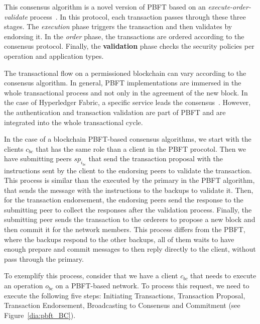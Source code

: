 \documentclass[conference]{IEEEtran}
\begin{document}
This consensus algorithm is a novel version of PBFT based on an \textit{execute-order-validate} process~\cite{androulaki2018hyperledger}. In this protocol, each transaction passes through these three stages. The \textit{execution} phase triggers the transaction and then validates by endorsing it. In the \textit{order} phase, the transactions are ordered according to the consensus protocol. Finally, the \textbf{validation} phase checks the security policies per operation and application types.

The transactional flow on a permissioned blockchain can vary according to the consensus algorithm. In general, PBFT implementations are immersed in the whole transactional process and not only in the agreement of the new block. In the case of Hyperledger Fabric, a specific service leads the consensus~\cite{androulaki2018hyperledger}. However, the authentication and transaction validation are part of PBFT and are integrated into the whole transactional cycle.  

In the case of a blockchain PBFT-based consensus algorithms, we start with the clients $c_{bc}$ that has the same role than a client in the PBFT procotol. Then we have submitting peers $sp_{i_{bc}}$ that send the transaction proposal with the instructions sent by the client to the endorsing peers to validate the transaction. This process is similar than the executed by the primary in the PBFT algorithm, that sends the message with the instructions to the backups to validate it. Then, for the transaction endorsement, the endorsing peers send the response to the submitting peer to collect the responses after the validation process. Finally, the submitting peer sends the transaction to the orderers to propose a new block and then commit it for the network members. This process differs from the PBFT, where the backups respond to the other backups, all of them waits to have enough prepare and commit messages to then reply directly to the client, without pass through the primary. 

To exemplify this process, consider that we have a client $c_{bc}$ that needs to execute an operation $o_{bc}$ on a PBFT-based network. To process this request, we need to execute the following five steps: Initiating Transactions, Transaction Proposal, Transaction Endorsement, Broadcasting to Consensus and Commitment (see Figure~\ref{dia:pbft_BC}).
\end{document}
